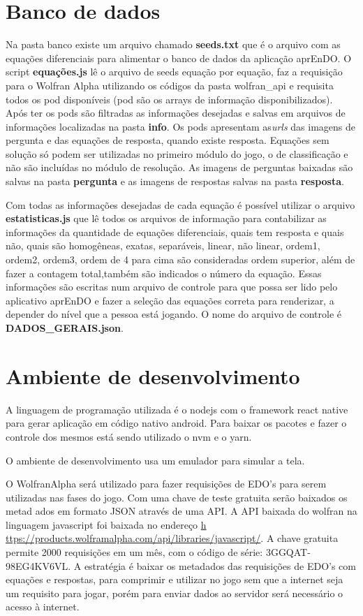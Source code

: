 \section[Banco de dados]{Banco de dados} 
Na pasta banco existe um arquivo chamado \textbf{seeds.txt} que é o arquivo com as equações diferenciais para alimentar o banco de dados da aplicação aprEnDO. O script \textbf{equações.js} lê o arquivo de seeds equação por equação, faz a requisição para o Wolfran Alpha utilizando os códigos da pasta wolfran\_api e requisita todos os pod disponíveis (pod são os arrays de informação disponibilizados). Após ter os pods são filtradas as informações desejadas e salvas em arquivos de informações localizadas na pasta \textbf{info}. Os pods apresentam as\textit{urls} das imagens de pergunta e das equações de resposta, quando existe resposta. Equações sem solução só podem ser utilizadas no primeiro módulo do jogo, o de classificação e não são incluídas no módulo de resolução. As imagens de perguntas baixadas são salvas na pasta \textbf{pergunta} e as imagens de respostas salvas na pasta \textbf{resposta}.

Com todas as informações desejadas de cada equação é possível utilizar o arquivo \textbf{estatisticas.js} que lê todos os arquivos de informação para contabilizar as informações da quantidade de equações diferenciais, quais tem resposta e quais não, quais são homogêneas, exatas, separáveis, linear, não linear, ordem1, ordem2, ordem3, ordem de 4 para cima são consideradas ordem superior, além de fazer a contagem total,também são indicados o número da equação. Essas informações são escritas num arquivo de controle para que possa ser lido pelo aplicativo aprEnDO e fazer a seleção das equações correta para renderizar, a depender do nível que a pessoa está jogando. O nome do arquivo de controle é \textbf{DADOS\_GERAIS.json}.




\section[Ambiente de desenvolvimento]{Ambiente de desenvolvimento}

A linguagem de programação utilizada é o nodejs com o framework react native para gerar aplicação em código nativo android. Para baixar os pacotes e fazer o controle dos mesmos está sendo utilizado o nvm e o yarn.

O ambiente de desenvolvimento usa um emulador para simular a tela.

O WolfranAlpha será utilizado para fazer requisições de EDO's para serem utilizadas nas fases do jogo. Com uma chave de teste gratuita serão baixados os metad    ados em formato JSON através de uma API.
A API baixada do wolfran na linguagem javascript foi baixada no endereço \url{h    ttps://products.wolframalpha.com/api/libraries/javascript/}.
A chave gratuita permite 2000 requisições em um mês, com o código de série: 3GGQAT-98EG4KV6VL. A estratégia é baixar os metadados das requisições de EDO's com     equações e respostas, para comprimir e utilizar no jogo sem que a internet seja um requisito para jogar, porém para enviar dados ao servidor será necessário o acesso à internet.
